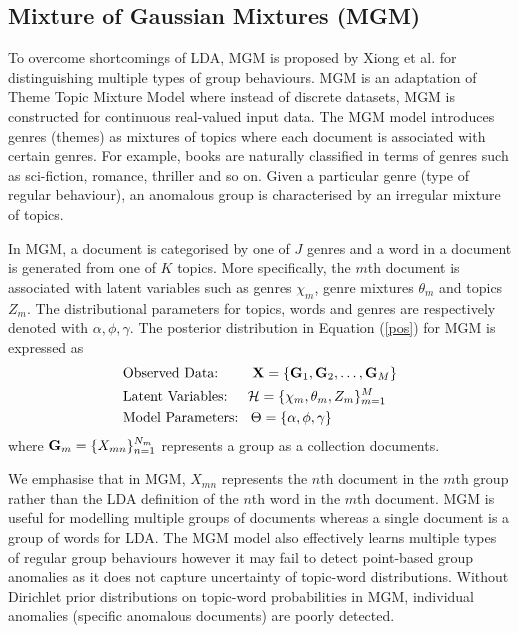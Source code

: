  

\subsection{ Mixture of Gaussian Mixtures (MGM)} 
 To overcome shortcomings of LDA, MGM is proposed by   Xiong et al. \cite{MGM} for distinguishing multiple types of group behaviours. %
  MGM is an adaptation of  Theme Topic Mixture Model  %
  \cite{TTMM}  where instead of discrete datasets, MGM is constructed for continuous real-valued input data.  The MGM model introduces genres (themes) as mixtures of topics where each document is associated with certain genres.   %
  For example, books are naturally classified in terms of genres such as sci-fiction, romance, thriller and so on. Given a particular genre (type of regular behaviour), an anomalous group is characterised by an irregular mixture of topics.  %


In MGM, a document is  categorised by one of $J$ genres and a word in a document is generated from one of $K$ topics.   More specifically, the $m$th document is associated with latent variables such as genres $\chi_{m}$, genre mixtures $\theta_{m}$ and topics $Z_m$. 
The distributional parameters for topics, words and genres are respectively denoted with $\alpha,\phi,\gamma$.  
 The  posterior distribution in Equation  (\ref{pos})   for MGM is expressed as %
 \begin{align*}
& \mbox{Observed Data:  \;\; \quad}  {\bf X}= \{{\bf G}_{1},{\bf G}_{2},\dots,{\bf G}_{M} \}\\
 & \mbox{Latent Variables: \quad}    \mathcal{H}=\{\chi_{m},\theta_m, Z_{m} \}_{m=1}^M  \\
 & \mbox{Model Parameters: \;\,}  \Theta=\{\alpha,\phi,\gamma\}
 \end{align*} 
  where ${\bf G}_{m} = \{ X_{mn} \}_{n=1}^{N_{m}}$ represents a group as a collection documents.  
  

We emphasise that in MGM, $  X_{mn} $ represents the $n$th document in the $m$th group rather than the LDA definition of the $n$th word in the $m$th document.   MGM is useful for modelling multiple groups of documents whereas a single document is a group of words for LDA.  
The MGM model also effectively learns multiple types of regular group behaviours however it may  fail to detect   point-based group anomalies  as it does not capture uncertainty of topic-word distributions. Without   Dirichlet prior distributions on topic-word probabilities in MGM, individual anomalies (specific anomalous documents) are poorly detected. 
 
